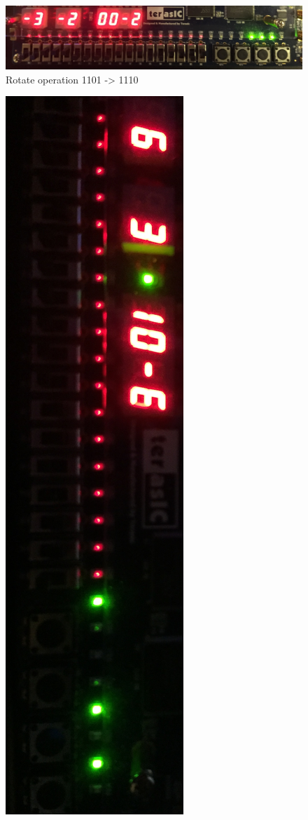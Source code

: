 \documentclass[12pt]{article}
\begin{document}
\begin{figure}[H]
\begin{center}
\includegraphics[scale=0.1]{example_rotate.png}
\caption{Rotate operation 1101 -> 1110}
\label{fig:boardsim1}
\end{center}
\end{figure}

\begin{figure}[H]
\begin{center}
\includegraphics[scale=0.1, angle=90]{example_inthedark.png}

\end{center}
\end{figure}
\end{document}
